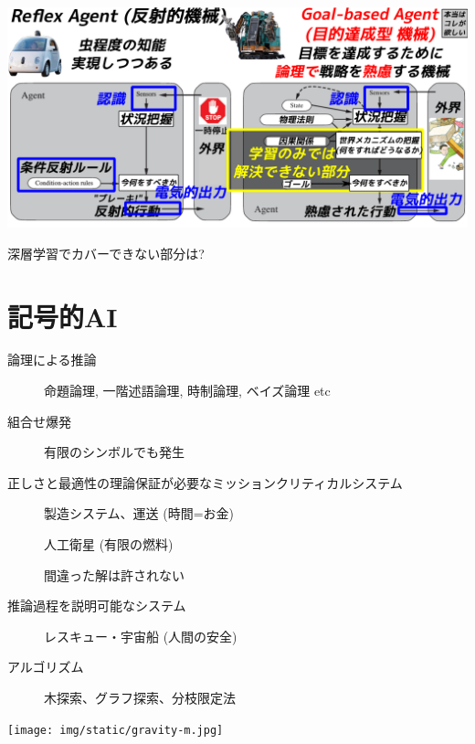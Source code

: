 \includegraphics{img/machines/4.png}

\begin{alignright}
深層学習でカバーできない部分は?
\end{alignright}

\section{記号的AI}
\label{sec:orgheadline37}

\begin{container-fluid}
\begin{row-fluid}
\begin{span7}
\begin{larger}
\begin{description}
\item[{論理による推論}] 命題論理, 一階述語論理, 時制論理, ベイズ論理 etc
\item[{組合せ爆発}] 有限のシンボルでも発生
\item[{正しさと最適性の理論保証が必要なミッションクリティカルシステム}] 製造システム、運送 (時間=お金)

人工衛星 (有限の燃料)

間違った解は許されない
\item[{推論過程を説明可能なシステム}] レスキュー・宇宙船 (人間の安全)
\item[{アルゴリズム}] 木探索、グラフ探索、分枝限定法
\end{description}
\end{larger}
\end{span7}
\begin{span5}


\texttt{[image: img/static/gravity-m.jpg]}
\end{span5}
\end{row-fluid}
\end{container-fluid}

